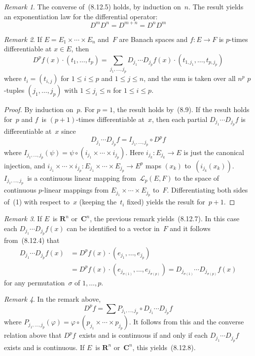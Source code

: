 \documentclass[letterpaper,12pt]{article}
\newcommand{\R}{\mathbf{R}}
\newcommand{\C}{\mathbf{C}}
\renewcommand{\L}{\mathcal{L}}
\newcommand{\after}{\circ}
\newcommand{\at}{\cdot}
\theoremstyle{plain}
\theoremstyle{definition}
\theoremstyle{remark}
\newtheorem*{rmk}{Remark}
\begin{document}
\begin{rmk}
The converse of~(8.12.5) holds, by induction on~\(n\). The result yields an exponentiation law for the differential operator:
\[D^m D^n=D^{m+n}=D^n D^m\]
\end{rmk}

\begin{rmk}
If \(E=E_1\times\cdots\times E_n\) and~\(F\) are Banach spaces and \(f:E\to F\) is \(p\)-times differentiable at \(x\in E\), then
\[D^pf(x)\at(t_1,\ldots,t_p)=\sum_{j_1,\ldots,j_p}D_{j_1}\cdots D_{j_p}f(x)\at(t_{1,j_1},\ldots,t_{p,j_p})\tag{1}\]
where \(t_i=(t_{i,j})\) for \(1\le i\le p\) and \(1\le j\le n\), and the sum is taken over all \(n^p\) \(p\)-tuples \((j_1,\ldots,j_p)\) with \(1\le j_i\le n\) for \(1\le i\le p\).
\end{rmk}
\begin{proof}
By induction on~\(p\). For \(p=1\), the result holds by~(8.9). If the result holds for~\(p\) and \(f\)~is \((p+1)\)-times differentiable at~\(x\), then each partial \(D_{j_1}\cdots D_{j_p}f\) is differentiable at~\(x\) since
\[D_{j_1}\cdots D_{j_p}f=I_{j_1,\ldots,j_p}\after D^pf\]
where \(I_{j_1,\ldots,j_p}(\psi)=\psi\after(i_{j_1}\times\cdots\times i_{j_p})\). Here \(i_{j_k}:E_{j_k}\to E\) is just the canonical injection, and \(i_{j_1}\times\cdots\times i_{j_p}:E_{j_1}\times\cdots\times E_{j_p}\to E^p\) maps \((x_k)\) to~\((i_{j_k}(x_k))\). \(I_{j_1,\ldots,j_p}\)~is a continuous linear mapping from~\(\L_p(E,F)\) to the space of continuous \(p\)-linear mappings from \(E_{j_1}\times\cdots\times E_{j_p}\) to~\(F\). Differentiating both sides of~(1) with respect to~\(x\) (keeping the~\(t_i\) fixed) yields the result for~\(p+1\).
\end{proof}

\begin{rmk}
If \(E\)~is \(\R^n\) or~\(\C^n\), the previous remark yields~(8.12.7). In this case each \(D_{j_1}\cdots D_{j_p}f(x)\) can be identified to a vector in~\(F\) and it follows from~(8.12.4) that
\begin{align*}
D_{j_1}\cdots D_{j_p}f(x)&=D^pf(x)\at(e_{j_1},\ldots,e_{j_p})\\
	&=D^pf(x)\at(e_{j_{\sigma(1)}},\ldots,e_{j_{\sigma(p)}})=D_{j_{\sigma(1)}}\cdots D_{j_{\sigma(p)}}f(x)
\end{align*}
for any permutation~\(\sigma\) of \(1,\ldots,p\).
\end{rmk}

\begin{rmk}
In the remark above,
\[D^pf=\sum P_{j_1,\ldots,j_p}\after D_{j_1}\cdots D_{j_p}f\]
where \(P_{j_1,\ldots,j_p}(\varphi)=\varphi\after(p_{j_1}\times\cdots\times p_{j_p})\). It follows from this and the converse relation above that \(D^pf\)~exists and is continuous if and only if each \(D_{j_1}\cdots D_{j_p}f\) exists and is continuous. If \(E\)~is \(\R^n\) or~\(\C^n\), this yields~(8.12.8).
\end{rmk}
\end{document}
